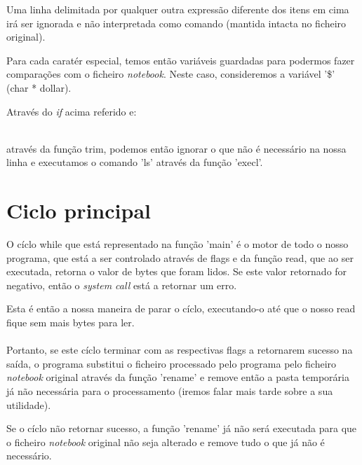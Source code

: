 \documentclass[11pt,a4paper]{report}
\begin{document}
Uma linha delimitada por qualquer outra expressão diferente dos itens em cima irá ser ignorada e não interpretada como comando (mantida intacta no ficheiro original).

Para cada caratér especial, temos então variáveis guardadas para podermos fazer comparações com o ficheiro \textit{notebook}. Neste caso, consideremos a variável '\$' (char * dollar).




Através do \textit{if} acima referido e:

 ~\\

através da função trim, podemos então ignorar o que não é necessário na nossa linha e executamos o comando 'ls' através da função 'execl'.


\section{Ciclo principal}

O cíclo while que está representado na função 'main' é o motor de todo o nosso programa, que está a ser controlado através de flags e da função read, que ao ser executada, retorna o valor de bytes que foram lidos. Se este valor retornado for negativo, então o \textit{system call} está a retornar um erro. 

Esta é então a nossa maneira de parar o cíclo, executando-o até que o nosso read fique sem mais bytes para ler.
~\\

~\\

Portanto, se este cíclo terminar com as respectivas flags a retornarem sucesso na saída, o programa substitui o ficheiro processado pelo programa pelo ficheiro  \textit{notebook} original através da função 'rename' e remove então a pasta temporária já não necessária para o processamento (iremos falar mais tarde sobre a sua utilidade).

Se o cíclo não retornar sucesso, a função 'rename' já não será executada para que o ficheiro \textit{notebook} original não seja alterado e remove tudo o que já não é necessário.
\end{document}
